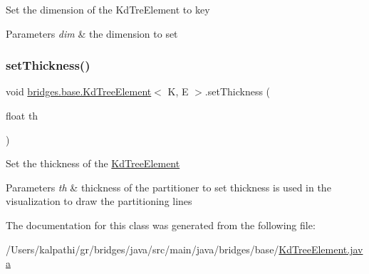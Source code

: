 Set the dimension of the Kd\+Tre\+Element to key 
\begin{DoxyParams}{Parameters}
{\em dim} & the dimension to set \\
\hline
\end{DoxyParams}
\mbox{\label{classbridges_1_1base_1_1_kd_tree_element_a52412fc59c743a8a0ede057ed2451be9}} 
\subsubsection{\texorpdfstring{setThickness()}{setThickness()}}
{\footnotesize\ttfamily void \mbox{\hyperlink{classbridges_1_1base_1_1_kd_tree_element}{bridges.\+base.\+Kd\+Tree\+Element}}$<$ K, E $>$.set\+Thickness (\begin{DoxyParamCaption}\item[{float}]{th }\end{DoxyParamCaption})}

Set the thickness of the \mbox{\hyperlink{classbridges_1_1base_1_1_kd_tree_element}{Kd\+Tree\+Element}} 
\begin{DoxyParams}{Parameters}
{\em th} & thickness of the partitioner to set thickness is used in the visualization to draw the partitioning lines \\
\hline
\end{DoxyParams}


The documentation for this class was generated from the following file\+:\begin{DoxyCompactItemize}
\item 
/\+Users/kalpathi/gr/bridges/java/src/main/java/bridges/base/\mbox{\hyperlink{_kd_tree_element_8java}{Kd\+Tree\+Element.\+java}}\end{DoxyCompactItemize}
